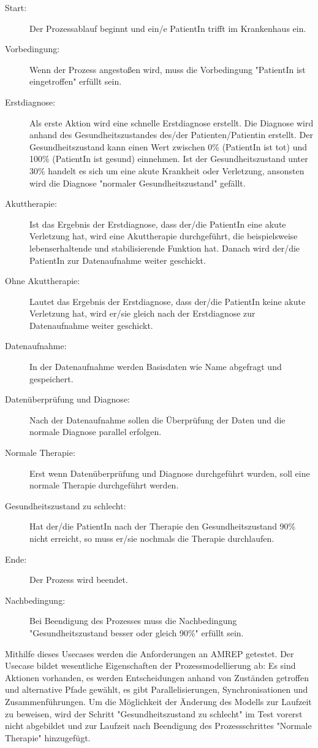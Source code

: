 \begin{description}
\item[Start:] Der Prozessablauf beginnt und ein/e PatientIn trifft im Krankenhaus ein.
\item[Vorbedingung:] Wenn der Prozess angestoßen wird, muss die Vorbedingung "PatientIn ist eingetroffen" erfüllt sein.
\item[Erstdiagnose:] Als erste Aktion wird eine schnelle Erstdiagnose erstellt. Die Diagnose wird anhand des Gesundheitszustandes des/der Patienten/Patientin erstellt. Der Gesundheitszustand kann einen Wert zwischen 0\% (PatientIn ist tot) und 100\% (PatientIn ist gesund) einnehmen. Ist der Gesundheitszustand unter 30\% handelt es sich um eine akute Krankheit oder Verletzung, ansonsten wird die Diagnose "normaler Gesundheitszustand" gefällt.
\item[Akuttherapie:] Ist das Ergebnis der Erstdiagnose, dass der/die PatientIn eine akute Verletzung hat, wird eine Akuttherapie durchgeführt, die beispielsweise lebenserhaltende und stabilisierende Funktion hat. Danach wird der/die PatientIn zur Datenaufnahme weiter geschickt.
\item[Ohne Akuttherapie:] Lautet das Ergebnis der Erstdiagnose, dass der/die PatientIn keine akute Verletzung hat, wird er/sie gleich nach der Erstdiagnose zur Datenaufnahme weiter geschickt.
\item[Datenaufnahme:] In der Datenaufnahme werden Basisdaten wie Name abgefragt und gespeichert.
\item[Datenüberprüfung und Diagnose:] Nach der Datenaufnahme sollen die Überprüfung der Daten und die normale Diagnose parallel erfolgen.
\item[Normale Therapie:] Erst wenn Datenüberprüfung und Diagnose durchgeführt wurden, soll eine normale Therapie durchgeführt werden.
\item[Gesundheitszustand zu schlecht:] Hat der/die PatientIn nach der Therapie den Gesundheitszustand 90\% nicht erreicht, so muss er/sie nochmals die Therapie durchlaufen.
\item[Ende:] Der Prozess wird beendet.
\item[Nachbedingung:] Bei Beendigung des Prozesses muss die Nachbedingung "Gesundheitszustand besser oder gleich 90\%" erfüllt sein.
\end{description}

Mithilfe dieses Usecases werden die Anforderungen an AMREP getestet. Der Usecase bildet wesentliche Eigenschaften der Prozessmodellierung ab: Es sind Aktionen vorhanden, es werden Entscheidungen anhand von Zuständen getroffen und alternative Pfade gewählt, es gibt Parallelisierungen, Synchronisationen und Zusammenführungen. Um die Möglichkeit der Änderung des Modells zur Laufzeit zu beweisen, wird der Schritt "Gesundheitszustand zu schlecht" im Test vorerst nicht abgebildet und zur Laufzeit nach Beendigung des Prozessschrittes "Normale Therapie" hinzugefügt.

